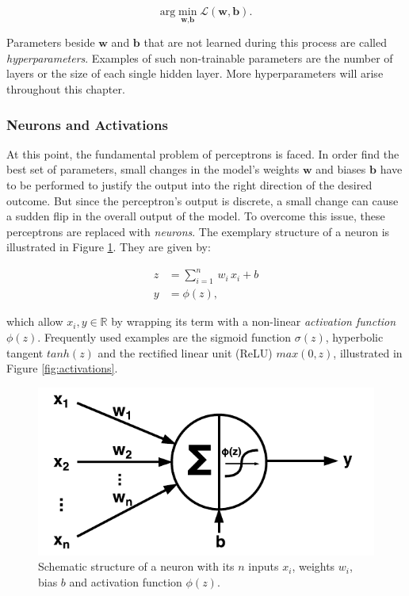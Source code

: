 \begin{equation} \label{eq:min-loss}
  \textrm{arg}\min_{\textbf{w}, \textbf{b}} \mathcal{L}(\textbf{w}, \textbf{b}) .
\end{equation}

Parameters beside $ \textbf{w} $ and $ \textbf{b} $ that are not learned during this process are called \textit{hyperparameters}. Examples of such non-trainable parameters are the number of layers or the size of each single hidden layer. More hyperparameters will arise throughout this chapter.


\subsubsection{Neurons and Activations}

At this point, the fundamental problem of perceptrons is faced. In order find the best set of parameters, small changes in the model's weights $ \textbf{w} $ and biases $ \textbf{b} $ have to be performed to justify the output into the right direction of the desired outcome. But since the perceptron's output is discrete, a small change can cause a sudden flip in the overall output of the model. To overcome this issue, these perceptrons are replaced with \textit{neurons}. The exemplary structure of a neuron is illustrated in Figure \ref{fig:neuron}. They are given by:

\begin{equation}
\begin{aligned}
z &= \sum\limits_{i=1}^n \, w_{i} \, x_{i} + b \\
y &= \phi(z) ,
\end{aligned}
\end{equation}

which allow $ x_{i}, y \in \mathbb{R} $ by wrapping its term with a non-linear \textit{activation function} $ \phi(z) $. Frequently used examples are the sigmoid function $ \sigma(z) $, hyperbolic tangent $ tanh(z) $ and the rectified linear unit (ReLU) $ max(0, z) $, illustrated in Figure \ref{fig:activations}.

\begin{figure}[htpb]
	\centering
	\includegraphics[width=.45\linewidth]{figures/neuron.pdf}
	\caption[Schematic Neuron]{Schematic structure of a neuron with its $ n $ inputs $x_{i}$, weights $w_{i}$, bias $ b $ and activation function $\phi(z)$.} \label{fig:neuron}
\end{figure}

